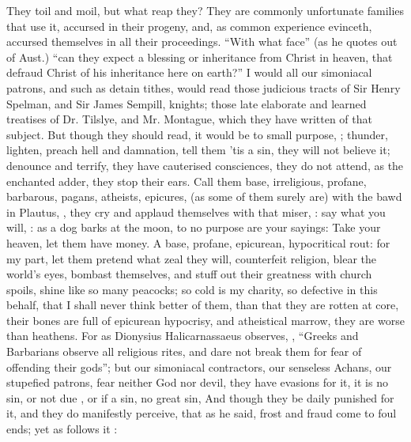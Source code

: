 They toil and moil, but what reap they? They are commonly unfortunate families
that use it, accursed in their progeny, and, as common experience evinceth,
accursed themselves in all their proceedings. \enquote{With what face} (as
he quotes out of Aust.) \enquote{can they expect a blessing or
inheritance from Christ in heaven, that defraud Christ of his inheritance here
on earth?} I would all our simoniacal patrons, and such as detain tithes, would
read those judicious tracts of Sir Henry Spelman, and Sir James Sempill,
knights; those late elaborate and learned treatises of Dr. Tilslye, and Mr.
Montague, which they have written of that subject. But though they should read,
it would be to small purpose, ;
thunder, lighten, preach hell and damnation, tell them 'tis a sin, they will
not believe it; denounce and terrify, they have cauterised
consciences, they do not attend, as the enchanted adder, they stop their ears.
Call them base, irreligious, profane, barbarous, pagans, atheists, epicures,
(as some of them surely are) with the bawd in Plautus, , they
cry and applaud themselves with that miser, : say what you will, : as a
dog barks at the moon, to no purpose are your sayings: Take your heaven, let
them have money. A base, profane, epicurean, hypocritical rout: for my part,
let them pretend what zeal they will, counterfeit religion, blear the world's
eyes, bombast themselves, and stuff out their greatness with church spoils,
shine like so many peacocks; so cold is my charity, so defective in this
behalf, that I shall never think better of them, than that they are rotten at
core, their bones are full of epicurean hypocrisy, and atheistical marrow, they
are worse than heathens. For as Dionysius Halicarnassaeus observes,
 , \etc{} \enquote{Greeks and Barbarians observe all religious rites, and dare not
break them for fear of offending their gods}; but our simoniacal contractors,
our senseless Achans, our stupefied patrons, fear neither God nor devil, they
have evasions for it, it is no sin, or not due , or if a sin,
no great sin, \etc{} And though they be daily punished for it, and they do
manifestly perceive, that as he said, frost and fraud come to foul ends; yet as
\Chrysostom{} follows it :
